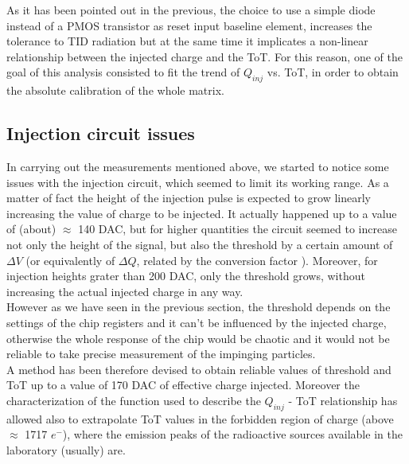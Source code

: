 

As it has been pointed out in the previous, the choice to use a simple diode instead of a PMOS transistor as reset input baseline element, increases the tolerance to TID radiation but at the same time it implicates a non-linear relationship between the injected charge and the ToT.  For this reason, one of the goal of this analysis consisted to fit the trend of $Q_{inj}$ vs. ToT, in order to obtain the absolute calibration of the whole matrix.


\subsection{Injection circuit issues} \label{inj_issue}


In carrying out the measurements mentioned above, we started to notice some issues with the injection circuit, which seemed to limit its working range. As a matter of fact the height of the injection pulse is expected to grow linearly increasing the value of charge to be injected.
It actually happened up to a value of (about) $\approx$ 140 DAC, but for higher quantities the circuit seemed to increase not only the height of the signal, but also the threshold by a certain amount of $\Delta V$ (or equivalently of $\Delta Q$, related by the conversion factor ). Moreover, for injection heights grater than 200 DAC, only the threshold grows, without increasing the actual injected charge in any way.\\
However as we have seen in the previous section, the threshold depends on the settings of the chip registers and it can't be influenced by the injected charge, otherwise the whole response of the chip would be chaotic and it would not be reliable to take precise measurement of the impinging particles. \\

A method has been therefore devised to obtain reliable values of threshold and ToT up to a value of 170 DAC of effective charge injected. Moreover the characterization of the function used to describe the $Q_{inj}$ - ToT relationship has allowed also to extrapolate ToT values in the forbidden region of charge (above $\approx$ 1717 $e^{-}$), where the emission peaks of the radioactive sources available in the laboratory (usually) are.



